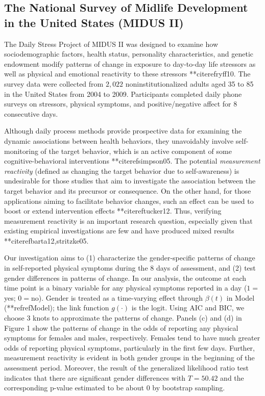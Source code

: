 \subsection{The National Survey of Midlife Development in the
United States (MIDUS II)}

The Daily Stress Project of MIDUS II was designed to examine how
sociodemographic factors, health status, personality
characteristics, and genetic endowment modify patterns of change
in exposure to day-to-day life stressors as well as physical and
emotional reactivity to these stressors **citeref{ryff10}. The survey
data were collected from $2,022$ noninstitutionalized adults aged
35 to 85 in the United States from 2004 to 2009. Participants
completed daily phone surveys on stressors, physical symptoms, and
positive/negative affect for 8 consecutive days.

Although daily process methods provide prospective data for
examining the dynamic associations between health behaviors, they
unavoidably involve self-monitoring of the target behavior, which
is an active component of some cognitive-behavioral interventions
**citeref{simpson05}. The potential \emph{measurement reactivity}
(defined as changing the target behavior due to self-awareness) is
undesirable for those studies that aim to investigate the
association between the target behavior and its precursor or
consequence. On the other hand, for those applications aiming to
facilitate behavior changes, such an effect can be used to boost
or extend intervention effects **citeref{tucker12}. Thus, verifying
measurement reactivity is an important research question,
especially given that existing empirical investigations are few
and have produced mixed results **citeref{barta12,stritzke05}.

Our investigation aims to (1) characterize the gender-specific
patterns of change in self-reported physical symptoms during the 8
days of assessment, and (2) test gender differences in patterns of
change. In our analysis, the outcome at each time point is a
binary variable for any physical symptoms reported in a day
($1=$yes; $0=$no). Gender is treated as a time-varying effect
through $\beta(t)$ in Model (**refref{Model}); the link function
$g(\cdot)$ is the logit. Using AIC and BIC, we choose 3 knots to
approximate the patterns of change. Panels (c) and (d) in Figure 1
show the patterns of change in the odds of reporting any physical
symptoms for females and males, respectively. Females tend to have
much greater odds of reporting physical symptoms, particularly in
the first few days. Further, measurement reactivity is evident in
both gender groups in the beginning of the assessment period.
Moreover, the result of the generalized likelihood ratio test
indicates that there are significant gender differences with
$T=50.42$ and the corresponding p-value estimated to be about $0$
by bootstrap sampling.


